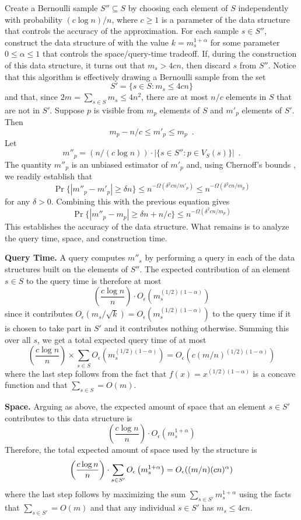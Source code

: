 \documentclass{patmorin}
\newcommand{\Oe}{O_\epsilon}
\begin{document}
Create a Bernoulli sample $S''\subseteq S$ by choosing each element
of $S$ independently with probability $(c\log n)/n$, where $c \ge 1$
is a parameter of the data structure that controls the accuracy of
the approximation.  For each sample $s\in S''$, construct the data
structure of  with the value $k=m_s^{1+\alpha}$
for some parameter $0\le\alpha \le 1$ that controls the space/query-time
tradeoff.  If, during the construction of this data structure, it turns
out that $m_s > 4cn$, then discard $s$ from $S''$.  Notice that
this algorithm is effectively drawing a Bernoulli sample from the set
\[
  S' = \{ s\in S : m_s \le 4cn \}
\]
and that, since $2m=\sum_{s\in S} m_s \le 4n^2$, there are at most $n/c$
elements in $S$ that are not in $S'$.
Suppose $p$ is visible from $m_p$ elements of $S$ and $m'_p$ elements of
$S'$.  Then
\[
     m_p - n/c \le m'_p \le m_p  \enspace .
\]
Let
\[
   m''_p= (n/(c\log n))\cdot |\{s\in S'': p\in V_S(s)\}| \enspace .
\]
The quantity $m''_p$ is an unbiased estimator of $m'_p$ and, using
Chernoff's bounds \cite[Appendix~A.1]{as08}, we readily establish that
\[
   \Pr\{|m''_p - m'_p| \ge \delta n\} \le n^{-\Omega(\delta^2cn/m'_p)}
           \le n^{-\Omega(\delta^2cn/m_p)}
\]
for any $\delta > 0$. Combining this with the previous equation gives
\[
   \Pr\{|m''_p - m_p| \ge \delta n + n/c\} \le n^{-\Omega(\delta^2 cn/m_p)} 
\]
This establishes the accuracy of the data structure.  What remains is to
analyze the query time, space, and construction time.

\noindent\textbf{Query Time.} A query computes $m''_s$ by performing
a query in each of the data structures built on the elements of $S''$.
The expected contribution of an element $s\in S$ to the query time is
therefore at most
\[
    \left(\frac{c\log n}{n}\right)\cdot\Oe\left(m_s^{(1/2)(1-\alpha)}\right)
\]
since it contributes $\Oe(m_s/\sqrt{k})=\Oe(m_s^{(1/2)(1-\alpha)})$ to the
query time if it is chosen to take part in $S'$ and it contributes
nothing otherwise.  Summing this over all $s$, we get a total expected query
time of at most
\[
     \left(\frac{c\log n}{n}\right)
         \times\sum_{s\in S}\Oe\left(m_s^{(1/2)(1-\alpha)}\right)
     = \Oe(c(m/n)^{(1/2)(1-\alpha)})
\]
where the last step follows from the fact that $f(x)=x^{(1/2)(1-\alpha)}$
is a concave function and that $\sum_{s\in S} = O(m)$.

\noindent\textbf{Space.} 
Arguing as above, the expected amount of space that an element $s\in S'$
contributes to this data structure is
\[
    \left(\frac{c\log n}{n}\right)\cdot \Oe\left(m_s^{1+\alpha}\right)
\]
Therefore, the total expected amount of space used by the structure is
\begin{equation}
    \left(\frac{c\log n}{n}\right)\cdot \sum_{s\in S'}\Oe\left(m_s^{1+\alpha}\right)
     = \Oe((m/n)(cn)^\alpha) \eqlabel{space-convex}
\end{equation}
where the last step follows by maximizing the sum $\sum_{s\in
S'}m_s^{1+\alpha}$ using the facts that $\sum_{s\in S'} = O(m)$ and that
any individual $s\in S'$ has $m_s \le 4cn$.
\end{document}
